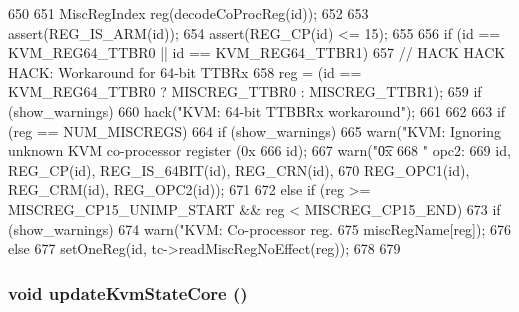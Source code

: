 \begin{DoxyCode}
650 {
651     MiscRegIndex reg(decodeCoProcReg(id));
652 
653     assert(REG_IS_ARM(id));
654     assert(REG_CP(id) <= 15);
655 
656     if (id == KVM_REG64_TTBR0 || id == KVM_REG64_TTBR1) {
657         // HACK HACK HACK: Workaround for 64-bit TTBRx
658         reg = (id == KVM_REG64_TTBR0 ? MISCREG_TTBR0 : MISCREG_TTBR1);
659         if (show_warnings)
660             hack("KVM: 64-bit TTBBRx workaround\n");
661     }
662 
663     if (reg == NUM_MISCREGS) {
664         if (show_warnings) {
665             warn("KVM: Ignoring unknown KVM co-processor register (0x%
666                  id);
667             warn("\t0x%
668                  " opc2: %
669                  id, REG_CP(id), REG_IS_64BIT(id), REG_CRN(id),
670                  REG_OPC1(id), REG_CRM(id), REG_OPC2(id));
671         }
672     } else if (reg >= MISCREG_CP15_UNIMP_START && reg < MISCREG_CP15_END) {
673         if (show_warnings)
674             warn("KVM: Co-processor reg. %
675                  miscRegName[reg]);
676     } else {
677         setOneReg(id, tc->readMiscRegNoEffect(reg));
678     }
679 }
\end{DoxyCode}
\hypertarget{classArmKvmCPU_ad705a24136d19a3497a77e57888e2111}{
\subsubsection[{updateKvmStateCore}]{\setlength{\rightskip}{0pt plus 5cm}void updateKvmStateCore ()}}
\label{classArmKvmCPU_ad705a24136d19a3497a77e57888e2111}



